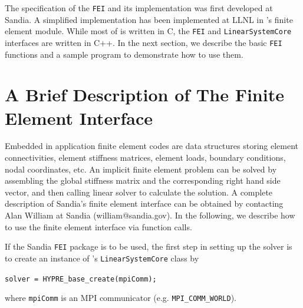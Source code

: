 The specification of the {\tt FEI} and its implementation was first
developed at Sandia. A simplified implementation has been implemented
at LLNL in \hypre{}'s finite element module. While most of \hypre{}
is written in C, the {\tt FEI} and {\tt LinearSystemCore}
interfaces are written in C++. In the next section, we 
describe the basic {\tt FEI} functions and a sample program to 
demonstrate how to use them. 

\section{A Brief Description of The Finite Element Interface}

Embedded in application finite element codes are data structures
storing element connectivities, element stiffness matrices, element
loads, boundary conditions, nodal coordinates, etc. An implicit finite
element problem can be solved by assembling the global stiffness matrix
and the corresponding right hand side vector, and then calling linear
solver to calculate the solution. A complete description of Sandia's
finite element interface can be obtained by contacting Alan William
at Sandia (william@sandia.gov). In the following, we describe how
to use the finite element interface via \hypre{} function calls.

If the Sandia {\tt FEI} package is to be used, the first step in
setting up the solver is to create an instance of \hypre{}'s
{\tt LinearSystemCore} class by
\begin{tabbing}
\hspace{0.5in} \= {\tt solver = HYPRE\_base\_create(mpiComm);}
\end{tabbing}
where {\tt mpiComm} is an MPI communicator (e.g. {\tt MPI\_COMM\_WORLD}).

